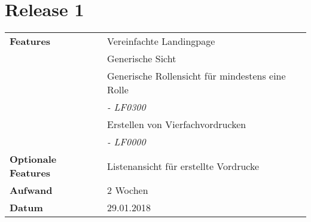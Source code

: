 \section*{Release 1 }
\label{sec:release_1}

\begin{tabular}{p{5cm}p{9cm}}
    \textbf{Features} & Vereinfachte Landingpage \\
    & Generische Sicht \\
    & Generische Rollensicht für mindestens eine Rolle \\
    & \hspace{8pt} \textit{\footnotesize - LF0300} \\
    & Erstellen von Vierfachvordrucken \\
    & \hspace{8pt} \textit{\footnotesize - LF0000} \\
    \textbf{Optionale Features} & Listenansicht für erstellte Vordrucke \\
    \hline
    \textbf{Aufwand} & 2 Wochen \\
    \hline
    \textbf{Datum} & 29.01.2018
\end{tabular}